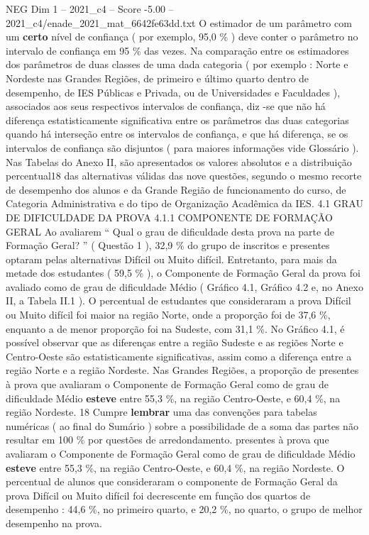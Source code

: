 \begin{textsample}{NEG Dim 1 – 2021\_c4 – Score -5.00 – 2021\_c4/enade\_2021\_mat\_6642fe63dd.txt}
O estimador de um parâmetro com um \textbf{certo} nível de confiança ( por exemplo, 95,0 \% ) deve conter o parâmetro no intervalo de confiança em 95 \% das vezes.
Na comparação entre os estimadores dos parâmetros de duas classes de uma dada categoria ( por exemplo : Norte e Nordeste nas Grandes Regiões, de primeiro e último quarto dentro de desempenho, de IES Públicas e Privada, ou de Universidades e Faculdades ), associados aos seus respectivos intervalos de confiança, diz -se que não há diferença estatisticamente significativa entre os parâmetros das duas categorias quando há interseção entre os intervalos de confiança, e que há diferença, se os intervalos de confiança são disjuntos ( para maiores informações vide Glossário ).
Nas Tabelas do Anexo II, são apresentados os valores absolutos e a distribuição percentual18 das alternativas válidas das nove questões, segundo o mesmo recorte de desempenho dos alunos e da Grande Região de funcionamento do curso, de Categoria Administrativa e do tipo de Organização Acadêmica da IES. 4.1 GRAU DE DIFICULDADE DA PROVA 4.1.1 COMPONENTE DE FORMAÇÃO GERAL Ao avaliarem “ Qual o grau de dificuldade desta prova na parte de Formação Geral? ” ( Questão 1 ), 32,9 \% do grupo de inscritos e presentes optaram pelas alternativas Difícil ou Muito difícil.
Entretanto, para mais da metade dos estudantes ( 59,5 \% ), o Componente de Formação Geral da prova foi avaliado como de grau de dificuldade Médio ( Gráfico 4.1, Gráfico 4.2 e, no Anexo II, a Tabela II.1 ).
O percentual de estudantes que consideraram a prova Difícil ou Muito difícil foi maior na região Norte, onde a proporção foi de 37,6 \%, enquanto a de menor proporção foi na Sudeste, com 31,1 \%.
No Gráfico 4.1, é possível observar que as diferenças entre a região Sudeste e as regiões Norte e Centro-Oeste são estatisticamente significativas, assim como a diferença entre a região Norte e a região Nordeste.
Nas Grandes Regiões, a proporção de presentes à prova que avaliaram o Componente de Formação Geral como de grau de dificuldade Médio \textbf{esteve} entre 55,3 \%, na região Centro-Oeste, e 60,4 \%, na região Nordeste. 18 Cumpre \textbf{lembrar} uma das convenções para tabelas numéricas ( ao final do Sumário ) sobre a possibilidade de a soma das partes não resultar em 100 \% por questões de arredondamento. presentes à prova que avaliaram o Componente de Formação Geral como de grau de dificuldade Médio \textbf{esteve} entre 55,3 \%, na região Centro-Oeste, e 60,4 \%, na região Nordeste.
O percentual de alunos que consideraram o componente de Formação Geral da prova Difícil ou Muito difícil foi decrescente em função dos quartos de desempenho : 44,6 \%, no primeiro quarto, e 20,2 \%, no quarto, o grupo de melhor desempenho na prova.

\end{textsample}
